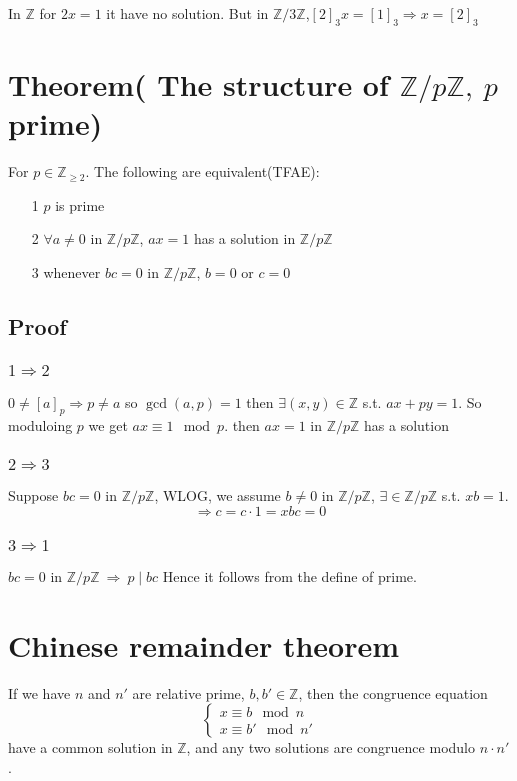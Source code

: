 \documentclass{book}
\begin{document}
In $\mathbb{Z}$ for $2x=1$ it have no solution. But in $\mathbb{Z}/3\mathbb{Z}$,$[2]_3x=[1]_3\Rightarrow x=[2]_3$
\section{Theorem( The structure of $\mathbb{Z}/p\mathbb{Z},\ p$ prime)}
For $p\in \mathbb{Z}_{\geq2}$. The following are equivalent(TFAE):
\begin{itemize}
	\item[1] $p$ is prime
	\item[2] $\forall  a\neq 0$ in $\mathbb{Z}/p\mathbb{Z}$, $ax=1$ has a solution in $\mathbb{Z}/p\mathbb{Z}$
	\item[3] whenever $bc=0$ in $\mathbb{Z}/p\mathbb{Z}$, $b=0$ or $c=0$
\end{itemize} 
\subsection*{Proof}
\subsubsection{$1\Rightarrow 2$}
$0\neq [a]_p\Rightarrow p\neq a$ so $\gcd(a,p)=1$ then $\exists(x,y)\in \mathbb{Z}$ s.t. $ax+py=1$. So moduloing $p$ we get $ax\equiv 1\mod p$. then $ax=1$ in $\mathbb{Z}/p\mathbb{Z}$ has a solution
\subsubsection{$2\Rightarrow 3$}
Suppose $bc=0$ in $\mathbb{Z}/p\mathbb{Z}$, WLOG, we assume $b\neq 0$ in $\mathbb{Z}/p\mathbb{Z}$, $\exists\in \mathbb{Z}/p\mathbb{Z}$ s.t. $xb=1$. $$\Rightarrow c=c\cdot 1=xbc=0$$
\subsubsection{$3\Rightarrow 1$}
$bc=0$ in $\mathbb{Z}/p\mathbb{Z}\ \Rightarrow\ p\mid bc$ Hence it follows from the define of prime.
\section{Chinese remainder theorem}
If we have $n$ and $n'$ are relative prime, $b,b'\in \mathbb Z$, then the congruence equation
$$\begin{cases}
	x\equiv b\mod n\\x\equiv b'\mod n'
\end{cases}$$
have a common solution in $\mathbb Z$, and any two solutions are congruence modulo $n\cdot n'$.
\end{document}
